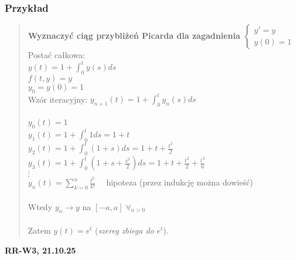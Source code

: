 \documentclass[10pt,a4paper]{article}
\newcommand{\zagadnienie}[3]{%
    \clearpage %
    \noindent\textbf{#1} #2\\
    #3
}
\begin{document}
{\subsubsection*{Przykład}
\begin{quote}
\textbf{Wyznaczyć ciąg przybliżeń Picarda dla zagadnienia $\begin{cases} y' = y \\ y(0) = 1 \end{cases}$}\\
Postać całkowa:\\
$y(t) = 1 + \int_{0}^{t} y(s) ds$\\
$f(t,y) = y$\\
$y_0 = y(0) = 1$\\
Wzór iteracyjny: $y_{n+1}(t) = 1 + \int_{0}^{t} y_n(s) ds$\\\\
$y_0(t) = 1$\\
$y_1(t) = 1 + \int_{0}^{t} 1 ds = 1 + t$\\
$y_2(t) = 1 + \int_{0}^{t} (1 + s) ds = 1 + t + \frac{t^2}{2}$\\
$y_3(t) = 1 + \int_{0}^{t} \left( 1 + s + \frac{s^2}{2} \right) ds = 1 + t + \frac{t^2}{2} + \frac{t^3}{6}$\\
$\vdots$\\
$y_n(t) = \sum_{k=0}^{n} \frac{t^k}{k!} \quad $ hipoteza (przez indukcję można dowieść)\\\\
Wtedy $y_n \to y$ na $[-a, a] \; \forall_{a > 0}$\\\\
Zatem $y(t) = e^t$ (\emph{szereg zbiega do } $e^t$).
\end{quote}

}



\zagadnienie{RR-W3, 21.10.25}{}
{
    
}
\end{document}
